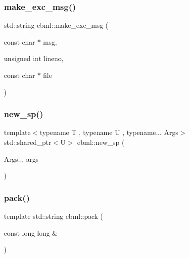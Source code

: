 \mbox{\label{namespaceebml_a41bf8a299c4418f406beff89817b0690}} 
\subsubsection{\texorpdfstring{make\+\_\+exc\+\_\+msg()}{make\_exc\_msg()}}
{\footnotesize\ttfamily std\+::string ebml\+::make\+\_\+exc\+\_\+msg (\begin{DoxyParamCaption}\item[{const char $\ast$}]{msg,  }\item[{unsigned int}]{lineno,  }\item[{const char $\ast$}]{file }\end{DoxyParamCaption})}

\mbox{\label{namespaceebml_a224edf6a007990902f8ae866e3e2fc59}} 
\subsubsection{\texorpdfstring{new\+\_\+sp()}{new\_sp()}}
{\footnotesize\ttfamily template$<$typename T , typename U , typename... Args$>$ \\
std\+::shared\+\_\+ptr$<$U$>$ ebml\+::new\+\_\+sp (\begin{DoxyParamCaption}\item[{Args...}]{args }\end{DoxyParamCaption})}

\mbox{\label{namespaceebml_a1c119d830a8a0d4f83e1362ade4c84ba}} 
\subsubsection{\texorpdfstring{pack()}{pack()}\hspace{0.1cm}{\footnotesize\ttfamily [1/18]}}
{\footnotesize\ttfamily template std\+::string ebml\+::pack (\begin{DoxyParamCaption}\item[{const long long \&}]{ }\end{DoxyParamCaption})}

\mbox{\label{namespaceebml_a71a18263f24d4160b1c97d74273745c7}} 
